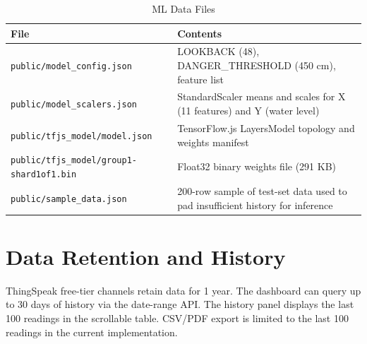 \begin{table}[H]
\centering
\caption{ML Data Files}
\begin{tabularx}{\linewidth}{|l|X|}
\hline
\rowcolor{FloodLight}
\textbf{File} & \textbf{Contents} \\
\hline
\texttt{public/\allowbreak{}model\_\allowbreak{}config.\allowbreak{}json} & LOOKBACK (48), DANGER\_THRESHOLD (450 cm), feature list \\
\texttt{public/\allowbreak{}model\_\allowbreak{}scalers.\allowbreak{}json} & StandardScaler means and scales for X (11 features) and Y (water level) \\
\texttt{public/\allowbreak{}tfjs\_\allowbreak{}model/\allowbreak{}model.\allowbreak{}json} & TensorFlow.js LayersModel topology and weights manifest \\
\texttt{public/\allowbreak{}tfjs\_\allowbreak{}model/\allowbreak{}group1-shard1of1.\allowbreak{}bin} & Float32 binary weights file (291 KB) \\
\texttt{public/\allowbreak{}sample\_\allowbreak{}data.\allowbreak{}json} & 200-row sample of test-set data used to pad insufficient history for inference \\
\hline
\end{tabularx}
\end{table}

\section{Data Retention and History}

ThingSpeak free-tier channels retain data for 1 year. The dashboard can query up to 30 days of history via the date-range API. The history panel displays the last 100 readings in the scrollable table. CSV/PDF export is limited to the last 100 readings in the current implementation.
